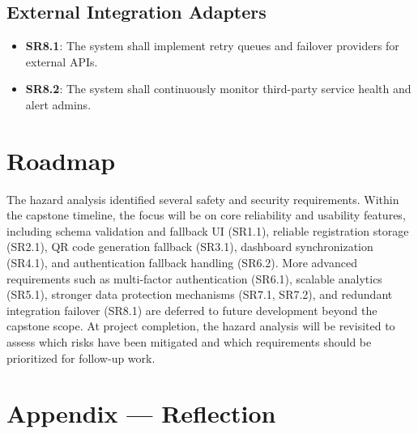 \documentclass{article}
\begin{document}
\subsection{External Integration Adapters}
\begin{itemize}
    \item \textbf{SR8.1}: The system shall implement retry queues and failover providers for external APIs.
    \item \textbf{SR8.2}: The system shall continuously monitor third-party service health and alert admins.
\end{itemize}


\section{Roadmap}

The hazard analysis identified several safety and security requirements. Within the capstone timeline, the focus will be on core reliability and usability features, including schema validation and fallback UI (SR1.1), reliable registration storage (SR2.1), QR code generation fallback (SR3.1), dashboard synchronization (SR4.1), and authentication fallback handling (SR6.2). More advanced requirements such as multi-factor authentication (SR6.1), scalable analytics (SR5.1), stronger data protection mechanisms (SR7.1, SR7.2), and redundant integration failover (SR8.1) are deferred to future development beyond the capstone scope. At project completion, the hazard analysis will be revisited to assess which risks have been mitigated and which requirements should be prioritized for follow-up work.


\newpage{}

\section*{Appendix --- Reflection}
\end{document}
